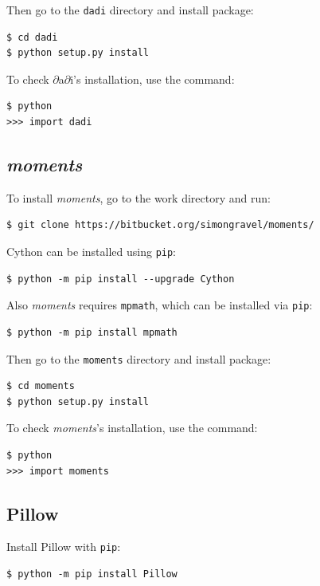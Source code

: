 \documentclass[12pt]{article}
\makeatletter
\newcommand{\dadi}{$\partial$a$\partial$i\xspace}
\newcommand{\moments}{\textit{moments}\xspace}
\newcommand{\py}[1]{\lstinline[language=Python, showstringspaces=False]@#1@}
\makeatother
\begin{document}
Then go to the \py{dadi} directory and install package:

\begin{lstlisting}
$ cd dadi
$ python setup.py install
\end{lstlisting}

To check \dadi's installation, use the command:

\begin{lstlisting}
$ python
>>> import dadi
\end{lstlisting}

\subsection{\moments}

To install \moments, go to the work directory and run:

\begin{lstlisting}
$ git clone https://bitbucket.org/simongravel/moments/
\end{lstlisting}

Cython can be installed using \py{pip}:
\begin{lstlisting}
$ python -m pip install --upgrade Cython
\end{lstlisting}

Also \moments requires \py{mpmath}, which can be installed via \py{pip}:
\begin{lstlisting}
$ python -m pip install mpmath
\end{lstlisting}

Then go to the \py{moments} directory and install package:

\begin{lstlisting}
$ cd moments
$ python setup.py install
\end{lstlisting}

To check \moments's installation, use the command:

\begin{lstlisting}
$ python
>>> import moments
\end{lstlisting}

\subsection{Pillow}

Install Pillow with \py{pip}:

\begin{lstlisting}
$ python -m pip install Pillow
\end{lstlisting}
\end{document}
